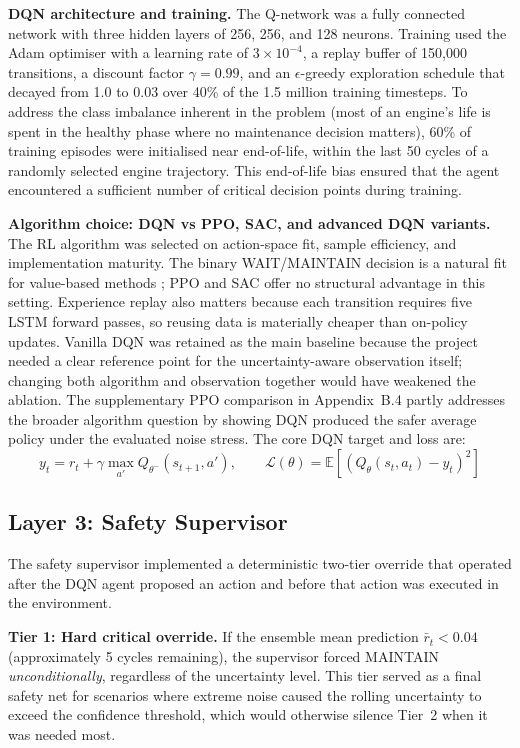 \documentclass[12pt,a4paper]{report}
\begin{document}
\textbf{DQN architecture and training.} The Q-network was a fully connected network with three hidden layers of 256, 256, and 128 neurons. Training used the Adam optimiser with a learning rate of $3 \times 10^{-4}$, a replay buffer of 150,000 transitions, a discount factor $\gamma = 0.99$, and an $\epsilon$-greedy exploration schedule that decayed from 1.0 to 0.03 over 40\% of the 1.5 million training timesteps. To address the class imbalance inherent in the problem (most of an engine's life is spent in the healthy phase where no maintenance decision matters), 60\% of training episodes were initialised near end-of-life, within the last 50 cycles of a randomly selected engine trajectory. This end-of-life bias ensured that the agent encountered a sufficient number of critical decision points during training.


\textbf{Algorithm choice: DQN vs PPO, SAC, and advanced DQN variants.} The RL algorithm was selected on action-space fit, sample efficiency, and implementation maturity. The binary WAIT/MAINTAIN decision is a natural fit for value-based methods \citep{mnih2015human}; PPO \citep{schulman2017proximal} and SAC \citep{haarnoja2018soft} offer no structural advantage in this setting. Experience replay also matters because each transition requires five LSTM forward passes, so reusing data is materially cheaper than on-policy updates. Vanilla DQN was retained as the main baseline because the project needed a clear reference point for the uncertainty-aware observation itself; changing both algorithm and observation together would have weakened the ablation. The supplementary PPO comparison in Appendix~B.4 partly addresses the broader algorithm question by showing DQN produced the safer average policy under the evaluated noise stress. The core DQN target and loss are:
\begin{equation}
y_t = r_t + \gamma \max_{a'}Q_{\theta^-}(s_{t+1}, a'), \qquad
\mathcal{L}(\theta)=\mathbb{E}\left[(Q_{\theta}(s_t,a_t)-y_t)^2\right]
\end{equation}

\subsection{Layer 3: Safety Supervisor}

The safety supervisor implemented a deterministic two-tier override that operated after the DQN agent proposed an action and before that action was executed in the environment.


\textbf{Tier 1: Hard critical override.} If the ensemble mean prediction $\bar{r}_t < 0.04$ (approximately 5 cycles remaining), the supervisor forced MAINTAIN \emph{unconditionally}, regardless of the uncertainty level. This tier served as a final safety net for scenarios where extreme noise caused the rolling uncertainty to exceed the confidence threshold, which would otherwise silence Tier~2 when it was needed most.
\end{document}
